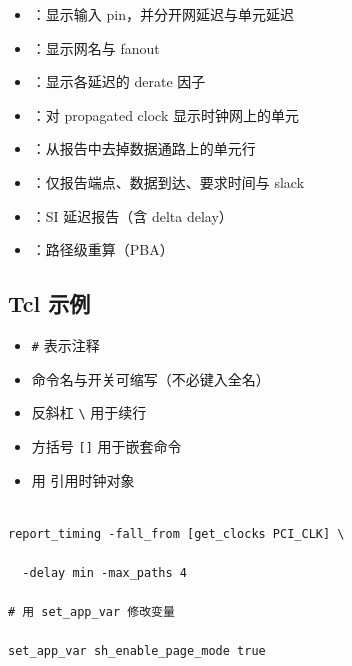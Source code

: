 \begin{itemize}

  \item {}：显示输入 pin，并分开网延迟与单元延迟

  \item {}：显示网名与 fanout

  \item {}：显示各延迟的 derate 因子

  \item {}：对 propagated clock 显示时钟网上的单元

  \item {}：从报告中去掉数据通路上的单元行

  \item {}：仅报告端点、数据到达、要求时间与 slack

  \item {}：SI 延迟报告（含 delta delay）

  \item {}：路径级重算（PBA）

\end{itemize}



\subsection{Tcl 示例}

\label{jobaid:rt-tcl}



\begin{itemize}

  \item \texttt{\#} 表示注释

  \item 命令名与开关可缩写（不必键入全名）

  \item 反斜杠 \texttt{\textbackslash} 用于续行

  \item 方括号 \texttt{[]} 用于嵌套命令

  \item 用  引用时钟对象

\end{itemize}



\begin{lstlisting}

report_timing -fall_from [get_clocks PCI_CLK] \

  -delay min -max_paths 4

# 用 set_app_var 修改变量

set_app_var sh_enable_page_mode true

\end{lstlisting}



